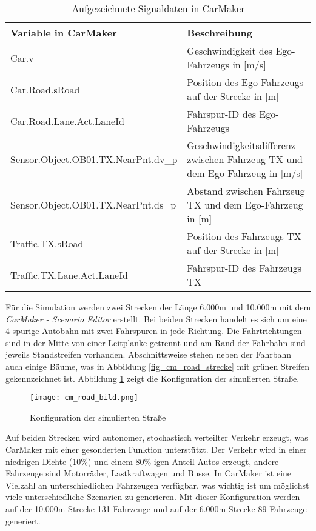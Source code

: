 \begin{table}[h]
\small
\centering
\def\arraystretch{1.4}
\begin{tabular}{p{6.2cm} p{7.5cm}}
\textbf{Variable in CarMaker} & \textbf{Beschreibung} \\
\hline

Car.v & Geschwindigkeit des Ego-Fahrzeugs in [m/s] \\
Car.Road.sRoad & Position des Ego-Fahrzeugs auf der Strecke in [m] \\
Car.Road.Lane.Act.LaneId & Fahrspur-ID des Ego-Fahrzeugs \\
\hline
Sensor.Object.OB01.TX.NearPnt.dv\_p & Geschwindigkeitsdifferenz zwischen Fahrzeug TX und dem Ego-Fahrzeug in [m/s] \\
Sensor.Object.OB01.TX.NearPnt.ds\_p & Abstand zwischen Fahrzeug TX und dem Ego-Fahrzeug in [m] \\
\hline
Traffic.TX.sRoad & Position des Fahrzeugs TX auf der Strecke in [m] \\
Traffic.TX.Lane.Act.LaneId & Fahrspur-ID des Fahrzeugs TX \\
\hline

\end{tabular}
\caption{Aufgezeichnete Signaldaten in CarMaker}
\label{tab_output_quantities}
\end{table}

Für die Simulation werden zwei Strecken der Länge 6.000m und 10.000m mit dem \textit{CarMaker - Scenario Editor} erstellt. Bei beiden Strecken handelt es sich um eine 4-spurige Autobahn mit zwei Fahrspuren in jede Richtung. Die Fahrtrichtungen sind in der Mitte von einer Leitplanke getrennt und am Rand der Fahrbahn sind jeweils Standstreifen vorhanden. Abschnittsweise stehen neben der Fahrbahn auch einige Bäume, was in Abbildung \ref{fig_cm_road_strecke} mit grünen Streifen gekennzeichnet ist. Abbildung \ref{fig_cm_road_bild} zeigt die Konfiguration der simulierten Straße.

\begin{figure}[h]
\centering
\texttt{[image: cm\_road\_bild.png]}
\caption{Konfiguration der simulierten Straße \cite{ipg2018carmaker}}
\label{fig_cm_road_bild}
\end{figure}

Auf beiden Strecken wird autonomer, stochastisch verteilter Verkehr erzeugt, was CarMaker mit einer gesonderten Funktion unterstützt. Der Verkehr wird in einer niedrigen Dichte (10\%) und einem 80\%-igen Anteil Autos erzeugt, andere Fahrzeuge sind Motorräder, Lastkraftwagen und Busse. In CarMaker ist eine Vielzahl an unterschiedlichen Fahrzeugen verfügbar, was wichtig ist um möglichst viele unterschiedliche Szenarien zu generieren. Mit dieser Konfiguration werden auf der 10.000m-Strecke 131 Fahrzeuge und auf der 6.000m-Strecke 89 Fahrzeuge generiert.

